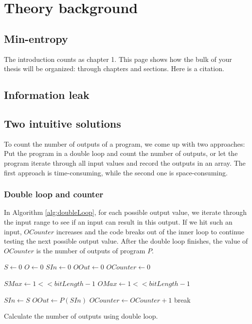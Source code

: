 \chapter{Theory background}
	\label{CH_02}

\section{Min-entropy}
The introduction counts as chapter 1.  This page shows how the bulk of your thesis will be organized: through chapters and sections. Here is a citation.\cite{OBTMBD01}

\section{Information leak}

\section{Two intuitive solutions}
To count the number of outputs of a program, we come up with two approaches: Put the program in a double loop and count the number of outputs, or let the program iterate through all input values and record the outputs in an array. The first approach is time-consuming, while the second one is space-consuming.

\subsection{Double loop and counter}
In Algorithm \ref{alg:doubleLoop}, for each possible output value, we iterate through the input range to see if an input can result in this output. If we hit such an input, $OCounter$ increases and the code breaks out of the inner loop to continue testing the next possible output value. After the double loop finishes, the value of $OCounter$ is the number of outputs of program $P$.

\begin{algorithm}
\begin{algorithmic}
\STATE $S \leftarrow 0$
\STATE $O \leftarrow 0$
\STATE $SIn \leftarrow 0$
\STATE $OOut \leftarrow 0$
\STATE $OCounter \leftarrow 0$

\STATE $SMax \leftarrow 1 << bitLength - 1$
\STATE $OMax \leftarrow 1 << bitLength - 1$

\STATE $SIn \leftarrow S$ 
\STATE $OOut \leftarrow P(SIn)$ 
\STATE $OCounter \leftarrow OCounter + 1$
\STATE break
\ENDIF
\ENDFOR
\ENDFOR
\end{algorithmic}

\caption[Double loop]{Calculate the number of outputs using double loop.}
\label{alg:doubleLoop}
\end{algorithm}

